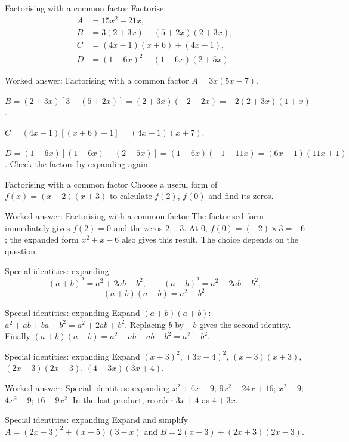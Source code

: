 \documentclass[aspectratio=169,10pt]{beamer}
\providecommand{\D}{\mathbb{D}}
\begin{document}
\begin{frame}{Factorising with a common factor}
Factorise:
\[\begin{aligned}
A&=15x^2-21x,\\B&=3(2+3x)-(5+2x)(2+3x),\\
C&=(4x-1)(x+6)+(4x-1),\\D&=(1-6x)^2-(1-6x)(2+5x).
\end{aligned}\]
\end{frame}
\begin{frame}{Worked answer: Factorising with a common factor}
\(A=3x(5x-7)\).

\(B=(2+3x)[3-(5+2x)]=(2+3x)(-2-2x)=-2(2+3x)(1+x)\).

\(C=(4x-1)[(x+6)+1]=(4x-1)(x+7)\).

\(D=(1-6x)[(1-6x)-(2+5x)]=(1-6x)(-1-11x)=(6x-1)(11x+1)\).
Check the factors by expanding again.
\end{frame}
\begin{frame}{Factorising with a common factor}
Choose a useful form of \(f(x)=(x-2)(x+3)\) to calculate \(f(2)\), \(f(0)\) and find its zeros.
\end{frame}
\begin{frame}{Worked answer: Factorising with a common factor}
The factorised form immediately gives \(f(2)=0\) and the zeros \(2,-3\). At \(0\), \(f(0)=(-2)\times3=-6\); the expanded form \(x^2+x-6\) also gives this result. The choice depends on the question.
\end{frame}
\begin{frame}{Special identities: expanding}
\[(a+b)^2=a^2+2ab+b^2,\qquad(a-b)^2=a^2-2ab+b^2,\]
\[(a+b)(a-b)=a^2-b^2.\]
\end{frame}
\begin{frame}{Special identities: expanding}
Expand \((a+b)(a+b)\): \(a^2+ab+ba+b^2=a^2+2ab+b^2\). Replacing \(b\) by \(-b\) gives the second identity. Finally \((a+b)(a-b)=a^2-ab+ab-b^2=a^2-b^2\).
\end{frame}
\begin{frame}{Special identities: expanding}
Expand \((x+3)^2\), \((3x-4)^2\), \((x-3)(x+3)\), \((2x+3)(2x-3)\), \((4-3x)(3x+4)\).
\end{frame}
\begin{frame}{Worked answer: Special identities: expanding}
\(x^2+6x+9\); \(9x^2-24x+16\); \(x^2-9\); \(4x^2-9\); \(16-9x^2\). In the last product, reorder \(3x+4\) as \(4+3x\).
\end{frame}
\begin{frame}{Special identities: expanding}
Expand and simplify \(A=(2x-3)^2+(x+5)(3-x)\) and \(B=2(x+3)+(2x+3)(2x-3)\).
\end{frame}
\end{document}
